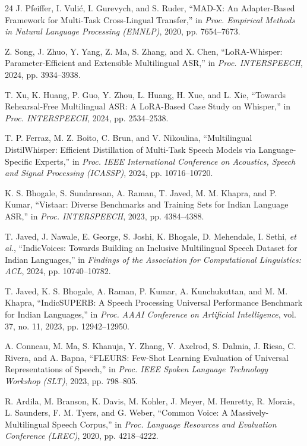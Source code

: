 \documentclass[conference]{IEEEtran}
\begin{document}
\begin{thebibliography}{24}
J. Pfeiffer, I. Vuli\'{c}, I. Gurevych, and S. Ruder, ``MAD-X: An
Adapter-Based Framework for Multi-Task Cross-Lingual Transfer,'' in
\emph{Proc. Empirical Methods in Natural Language Processing (EMNLP)},
2020, pp. 7654--7673.

Z. Song, J. Zhuo, Y. Yang, Z. Ma, S. Zhang, and X. Chen, ``LoRA-Whisper:
Parameter-Efficient and Extensible Multilingual ASR,'' in \emph{Proc.
INTERSPEECH}, 2024, pp. 3934--3938.

T. Xu, K. Huang, P. Guo, Y. Zhou, L. Huang, H. Xue, and L. Xie,
``Towards Rehearsal-Free Multilingual ASR: A LoRA-Based Case Study on
Whisper,'' in \emph{Proc. INTERSPEECH}, 2024, pp. 2534--2538.

T. P. Ferraz, M. Z. Boito, C. Brun, and V. Nikoulina, ``Multilingual
DistilWhisper: Efficient Distillation of Multi-Task Speech Models via
Language-Specific Experts,'' in \emph{Proc. IEEE International
Conference on Acoustics, Speech and Signal Processing (ICASSP)}, 2024,
pp. 10716--10720.

K. S. Bhogale, S. Sundaresan, A. Raman, T. Javed, M. M. Khapra, and
P. Kumar, ``Vistaar: Diverse Benchmarks and Training Sets for Indian
Language ASR,'' in \emph{Proc. INTERSPEECH}, 2023, pp. 4384--4388.

T. Javed, J. Nawale, E. George, S. Joshi, K. Bhogale, D. Mehendale,
I. Sethi, \emph{et al.},
``IndicVoices: Towards Building an Inclusive Multilingual Speech Dataset
for Indian Languages,'' in \emph{Findings of the Association for
Computational Linguistics: ACL}, 2024, pp. 10740--10782.

T. Javed, K. S. Bhogale, A. Raman, P. Kumar, A. Kunchukuttan, and
M. M. Khapra, ``IndicSUPERB: A Speech Processing Universal Performance
Benchmark for Indian Languages,'' in \emph{Proc. AAAI Conference on
Artificial Intelligence}, vol. 37, no. 11, 2023, pp. 12942--12950.

A. Conneau, M. Ma, S. Khanuja, Y. Zhang, V. Axelrod, S. Dalmia,
J. Riesa, C. Rivera, and A. Bapna, ``FLEURS: Few-Shot Learning
Evaluation of Universal Representations of Speech,'' in \emph{Proc. IEEE
Spoken Language Technology Workshop (SLT)}, 2023, pp. 798--805.

R. Ardila, M. Branson, K. Davis, M. Kohler, J. Meyer, M. Henretty,
R. Morais, L. Saunders, F. M. Tyers, and G. Weber, ``Common Voice: A
Massively-Multilingual Speech Corpus,'' in \emph{Proc. Language
Resources and Evaluation Conference (LREC)}, 2020, pp. 4218--4222.


\end{thebibliography}
\end{document}
